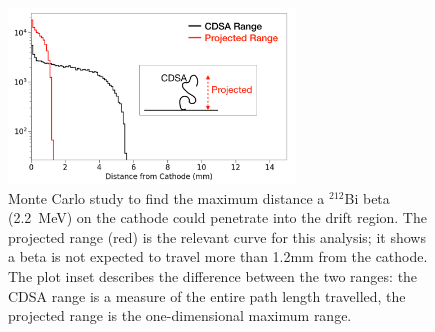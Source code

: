 \begin{figure}[ht]
    \centering
    \includegraphics[width=3in]{figures/radon/betaMC_inset.png}
    \caption{Monte Carlo study to find the maximum distance a $^{212}$Bi beta (2.2~MeV) on the cathode could penetrate into the drift region. The projected range (red) is the relevant curve for this analysis; it shows a beta is not expected to travel more than 1.2mm from the cathode. The plot inset describes the difference between the two ranges: the CDSA range is a measure of the entire path length travelled, the projected range is the one-dimensional maximum range.}
    \label{fig:betaMC}
\end{figure}




